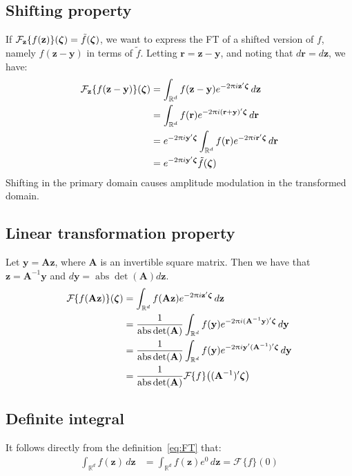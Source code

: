 \documentclass[a4paper,oneside,12pt,english]{report}
\def\zvec{\mathbf{z}}
\DeclareMathOperator{\abs}{abs}
\def\R{\mathbb{R}}
\def\yvec{\mathbf{y}}
\def\rvec{\mathbf{r}}
\def\Fset{\mathcal{F}}
\newcommand\FT[2][]{\Fset_{#1}\{#2\}}
\begin{document}
\subsection{Shifting property}
If $\FT[\zvec]{f(\zvec)}(\zetavec)=\tilde f(\zetavec)$, we want to express the FT of a shifted version of $f$, namely $f(\zvec-\yvec)$ in terms of $\tilde f$. Letting $\rvec=\zvec-\yvec$, and noting that $d\rvec=d\zvec$, we have: 
\begin{align}
\begin{split}
\FT[\zvec]{f(\zvec-\yvec)}(\zetavec) &= \int_{\R^d} f(\zvec-\yvec)e^{-2\uppi i\zvec'\zetavec}\,d\zvec\\
&= \int_{\R^d} f(\rvec)e^{-2\uppi i(\rvec+\yvec)'\zetavec}\,d\rvec \\
&= e^{-2\uppi i\yvec'\zetavec}\int_{\R^d} f(\rvec)e^{-2\uppi i\rvec'\zetavec}\,d\rvec \\
&= e^{-2\uppi i\yvec'\zetavec}\tilde f(\zetavec) \\
\end{split}
\end{align}
Shifting in the primary domain causes amplitude modulation in the transformed domain.



\subsection{Linear transformation property}
\def\Amat{\mathbf{A}}
Let $\yvec = \Amat\zvec$, where $\Amat$ is an invertible square matrix. Then we have that $\zvec = \Amat^{-1}\yvec$ and $d\yvec = \abs{\det(\Amat)}d\zvec$. 
\begin{align}
\label{eq:ftscaling}
\begin{split}
\FT{f(\Amat\zvec)}(\zetavec) &= \int_{\R^d} f(\Amat\zvec)e^{-2\uppi i\zvec'\zetavec}\,d\zvec\\
&= \frac1{\abs{\det(\Amat)}}\int_{\R^d} f(\yvec)e^{-2\uppi i(\Amat^{-1}\yvec)'\zetavec}\,d\yvec\\
&= \frac1{\abs{\det(\Amat)}}\int_{\R^d} f(\yvec)e^{-2\uppi i\yvec'(\Amat^{-1})'\zetavec}\,d\yvec\\
&= \frac1{\abs{\det(\Amat)}}\FT{f}\bigl((\Amat^{-1})'\zetavec\bigr)
\end{split}
\end{align}

 
\subsection{Definite integral}
It follows directly from the definition~\eqref{eq:FT} that:
\begin{align}
\label{eq:di}
\int_{\R^d} f(\zvec)\,d\zvec &= \int_{\R^d} f(\zvec)e^0\,d\zvec = \FT{f}(0)
\end{align}
\end{document}
